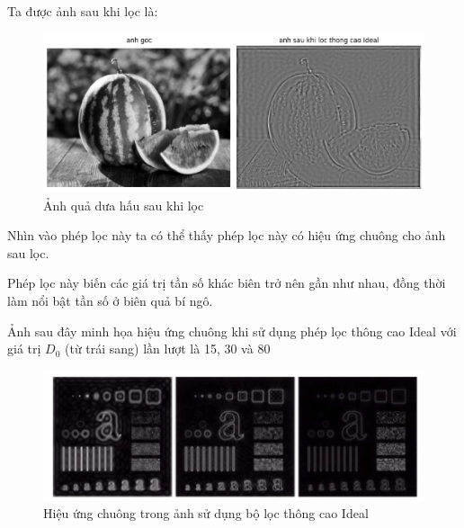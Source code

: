 \documentclass[12pt,a4paper]{report}
\numberwithin{equation}{section}
\theoremstyle{definition} %
\begin{document}
Ta được ảnh sau khi lọc là:
\begin{figure}[H]
\centering
\includegraphics[width=0.9\linewidth]{img/idealhighpass/IHPFanhgocvaAnhsauloc.png}
\caption{Ảnh quả dưa hấu sau khi lọc }
\label{fig130}
\end{figure}

Nhìn vào phép lọc này ta có thể thấy phép lọc này có hiệu ứng chuông cho ảnh sau lọc.

Phép lọc này biến các giá trị tần số khác biên trở nên gần như nhau, đồng thời làm nổi bật tần số ở biên quả bí ngô.

Ảnh sau đây minh họa hiệu ứng chuông khi sử dụng phép lọc thông cao Ideal với giá trị $D_0$ (từ trái sang) lần lượt là 15, 30 và 80

\begin{figure}[H]
\centering
\includegraphics[width=0.8\linewidth]{img/idealhighpass/IHPFvidu1.png}
\caption{Hiệu ứng chuông trong ảnh sử dụng bộ lọc thông cao Ideal}
\label{fig131}
\end{figure}
\end{document}
